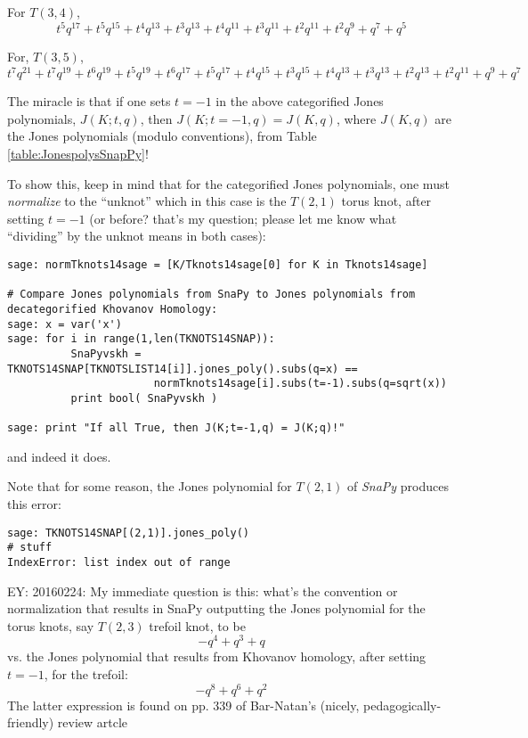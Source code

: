 \documentclass[10pt]{amsart}
\begin{document}
\begin{landscape}
For $T(3,4)$,
\begin{dmath}
t^{5} q^{17} + t^{5} q^{15} + t^{4} q^{13} + t^{3} q^{13} + t^{4} q^{11} + t^{3} q^{11} + t^{2} q^{11} + t^{2} q^{9} + q^{7} + q^{5}
\end{dmath}

For, $T(3,5)$,
\begin{dmath}
t^{7} q^{21} + t^{7} q^{19} + t^{6} q^{19} + t^{5} q^{19} + t^{6} q^{17} + t^{5} q^{17} + t^{4} q^{15} + t^{3} q^{15} + t^{4} q^{13} + t^{3} q^{13} + t^{2} q^{13} + t^{2} q^{11} + q^{9} + q^{7}
\end{dmath}


\end{landscape}




The miracle is that if one sets $t=-1$ in the above categorified Jones polynomials, $J(K;t,q)$, then $J(K;t=-1,q) = J(K,q)$, where $J(K,q)$ are the Jones polynomials (modulo conventions), from Table \ref{table:JonespolysSnapPy}!

To show this, keep in mind that for the categorified Jones polynomials, one must \emph{normalize} to the ``unknot'' which in this case is the $T(2,1)$ torus knot, after setting $t=-1$ (or before? that's my question; please let me know what ``dividing'' by the unknot means in both cases):
\begin{lstlisting}
sage: normTknots14sage = [K/Tknots14sage[0] for K in Tknots14sage]

# Compare Jones polynomials from SnaPy to Jones polynomials from decategorified Khovanov Homology:
sage: x = var('x')
sage: for i in range(1,len(TKNOTS14SNAP)):
          SnaPyvskh = TKNOTS14SNAP[TKNOTSLIST14[i]].jones_poly().subs(q=x) == 
                       normTknots14sage[i].subs(t=-1).subs(q=sqrt(x))
          print bool( SnaPyvskh )

sage: print "If all True, then J(K;t=-1,q) = J(K;q)!"
\end{lstlisting}  
and indeed it does.  

Note that for some reason, the Jones polynomial for $T(2,1)$ of \emph{SnaPy} produces this error: 
\begin{lstlisting}
sage: TKNOTS14SNAP[(2,1)].jones_poly()
# stuff
IndexError: list index out of range
\end{lstlisting}

EY: 20160224: My immediate question is this: what's the convention or normalization that results in SnaPy outputting the Jones polynomial for the torus knots, say $T(2,3)$ trefoil knot, to be
\[
-q^{4} + q^{3} + q
\]
vs. the Jones polynomial that results from Khovanov homology, after setting $t=-1$, for the trefoil:
\[
- q^{8} + q^{6} + q^{2}
\]
The latter expression is found on pp. 339 of Bar-Natan's (nicely, pedagogically-friendly) review artcle \cite{DBar-Natan2002}
\end{document}
